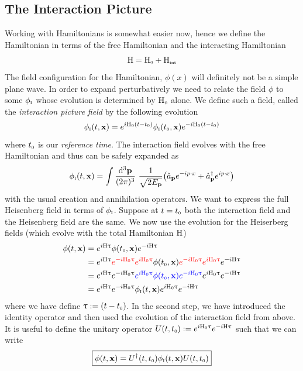 \subsection{The Interaction Picture}
Working with Hamiltonians is somewhat easier now, hence we define the Hamiltonian in terms of the free Hamiltonian and the interacting Hamiltonian 
$$\mathrm{H} = \mathrm{H}_{\text{\tiny 0}} + \mathrm{H}_{\text{\tiny int}}$$
The field configuration for the Hamiltonian, $\phi(x)$ will definitely not be a simple plane wave. In order to expand perturbatively we need to relate the field $\phi$ to some $\phi_{\text{\tiny I}}$ whose evolution is determined by $\mathrm{H}_{\text{\tiny 0}}$ alone. We define such a field, called the \textit{interaction picture field} by the following evolution
$$\phi_{\text{\tiny I}}(t,\vb{x}) = e^{i\mathrm{H}_{\text{\tiny 0}}(t-t_{\text{\tiny 0}})}\phi_{\text{\tiny I}}(t_{\text{\tiny 0}},\vb{x})e^{-i\mathrm{H}_{\text{\tiny 0}}(t-t_{\text{\tiny 0}})}$$
where ${t_{\text{\tiny 0}}}$ is our \textit{reference time}. The interaction field evolves with the free Hamiltonian and thus can be safely expanded as
$$\phint(t,\vb{x}) = \int \meas{\vb{p}} \ \frac{1}{\sqrt{2E_{\vb{p}}}} \qty(\annp e^{-ip\cdot x} + \crep e^{ip\cdot x})$$
with the usual creation and annihilation operators. We want to express the full Heisenberg field in terms of $\phi_{\text{\tiny I}}$. Suppose at $t=t_{\text{\tiny 0}}$ both the interaction field and the Heisenberg field are the same. We now use the evolution for the Heiserberg fields (which evolve with the total Hamiltonian $\mathrm{H}$)
\begin{align*}
    \phi(t,\vb{x}) &=e^{i\MH \uptau} \phi(t\tund{0},\vb{x})e^{-i\MH \uptau} \\
    &=e^{i\MH \uptau}  \mathcolor{red}{e^{-i\MH\tund{0} \uptau}e^{i\MH\tund{0} \uptau}} \phi(t\tund{0},\vb{x})\mathcolor{red}{e^{-i\MH\tund{0} \uptau}e^{i\MH\tund{0} \uptau}}e^{-i\MH \uptau} \\
    &=e^{i\MH \uptau}  e^{-i\MH\tund{0} \uptau}\mathcolor{blue}{e^{i\MH\tund{0} \uptau} \phi(t\tund{0},\vb{x})e^{-i\MH\tund{0} \uptau}}e^{i\MH\tund{0} \uptau}e^{-i\MH \uptau}\\
    &=e^{i\MH \uptau}  e^{-i\MH\tund{0} \uptau} \phint(t,\vb{x}) e^{i\MH\tund{0} \uptau} e^{-i\MH \uptau}
\end{align*}
where we have define $\uptau:=(t-t_{\text{\tiny 0}})$. In the second step, we have introduced the identity operator and then used the evolution of the interaction field from above. \\[0.2cm]
It is useful to define the unitary operator $U(t, t_{\text{\tiny 0}}):= e^{i\mathrm{H}_{\text{\tiny 0}} \uptau}e^{-i\mathrm{H}\uptau}$ such that we can write
$$\boxed{\phi(t,\vb{x}) = U^\dagger(t,t_{\text{\tiny 0}}) \phi_{\text{\tiny I}}(t,\vb{x}) U(t,t_{\text{\tiny 0}})}$$
